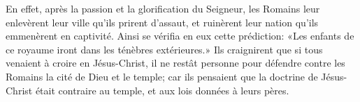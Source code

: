 En effet, après la passion et la glorification du Seigneur,
	les Romains leur enlevèrent leur ville qu’ils prirent d’assaut,
	et ruinèrent leur nation qu’ils emmenèrent en captivité.
Ainsi se vérifia en eux cette prédiction:
	«Les enfants de ce royaume iront dans les ténèbres extérieures.»
Ils craignirent que si tous venaient à croire en Jésus-Christ,
	il ne restât personne
		pour défendre contre les Romains la cité de Dieu et le temple;
	car ils pensaient que la doctrine de Jésus-Christ était contraire au temple,
	et aux lois données à leurs pères.
